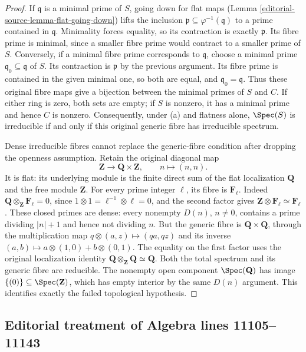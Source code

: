 \begin{proof}
If $\mathfrak q$ is a minimal
prime of $S$, going down for
flat maps (Lemma \ref{editorial-source-lemma-flat-going-down}) lifts the inclusion
$\mathfrak p\subseteq\varphi^{-1}(\mathfrak q)$
to a prime contained in
$\mathfrak q$. Minimality forces
equality, so its contraction is
exactly $\mathfrak p$. Its fibre
prime is minimal, since a smaller
fibre prime would contract to
a smaller prime of $S$.
Conversely, if a minimal fibre
prime corresponds to $\mathfrak q$,
choose a minimal prime
$\mathfrak q_0\subseteq\mathfrak q$
of $S$. Its contraction is
$\mathfrak p$ by the previous
argument. Its fibre prime is
contained in the given minimal
one, so both are equal, and
$\mathfrak q_0=\mathfrak q$.
Thus these original fibre maps
give a bijection between the
minimal primes of $S$ and $C$.
If either ring is zero, both
sets are empty; if $S$ is nonzero,
it has a minimal prime and hence
$C$ is nonzero. Consequently,
under (a) and flatness alone,
$\Spec(S)$ is irreducible if and
only if this original generic
fibre has irreducible spectrum.

Dense irreducible fibres cannot
replace the generic-fibre condition
after dropping the openness
assumption. Retain the original
diagonal map
$$
\mathbf Z\longrightarrow\mathbf Q\times\mathbf Z,
\qquad n\longmapsto(n,n).
$$
It is flat: its underlying module
is the finite direct sum of the
flat localization $\mathbf Q$
and the free module $\mathbf Z$.
For every prime integer $\ell$,
its fibre is $\mathbf F_\ell$.
Indeed $\mathbf Q\otimes_{\mathbf Z}\mathbf F_\ell=0$,
since $1\otimes1=\ell^{-1}\otimes\ell=0$,
and the second factor gives
$\mathbf Z\otimes\mathbf F_\ell\simeq\mathbf F_\ell$.
These closed primes are dense:
every nonempty $D(n)$, $n\neq0$,
contains a prime dividing $|n|+1$
and hence not dividing $n$.
But the generic fibre is
$\mathbf Q\times\mathbf Q$,
through the multiplication map
$q\otimes(a,z)\mapsto(qa,qz)$
and its inverse
$(a,b)\mapsto a\otimes(1,0)+b\otimes(0,1)$.
The equality on the first factor
uses the original localization
identity $\mathbf Q\otimes_{\mathbf Z}\mathbf Q\simeq\mathbf Q$.
Both the total spectrum and its
generic fibre are reducible.
The nonempty open component
$\Spec(\mathbf Q)$ has image
$\{(0)\}\subseteq\Spec(\mathbf Z)$,
which has empty interior by the
same $D(n)$ argument. This
identifies exactly the failed
topological hypothesis.
\end{proof}


\subsection{Editorial treatment of Algebra lines 11105--11143}

